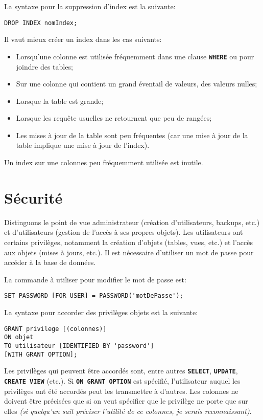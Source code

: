 \documentclass[a4paper, 12pt]{report}
\newcommand{\textSQL}[1]{\texttt{\textbf{#1}}}
\theoremstyle{definition} \newtheorem{ex}{Exemple}
\begin{document}
La syntaxe pour la suppression d'index est la suivante:
\begin{lstlisting}[frame=single]
DROP INDEX nomIndex;
\end{lstlisting}

Il vaut mieux créer un index dans les cas suivants:
\begin{itemize}
  \item Lorsqu'une colonne est utilisée fréquemment dans une clause \textSQL{WHERE} ou pour joindre des tables;
	\item Sur une colonne qui contient un grand éventail de valeurs, des valeurs nulles;
	\item Lorsque la table est grande;
	\item Lorsque les requête usuelles ne retournent que peu de rangées;
	\item Les mises à jour de la table sont peu fréquentes (car une mise à jour de la table implique une mise à jour de l'index).
\end{itemize}

Un index sur une colonnes peu fréquemment utilisée est inutile.
\chapter{Sécurité}
Distinguons le point de vue administrateur (création d'utilisateurs, backups, etc.) et d'utilisateurs (gestion de l'accès à ses propres objets). Les utilisateurs ont certains privilèges, notamment la création d'objets (tables, vues, etc.) et l'accès aux objets (mises à jours, etc.). Il est nécessaire d'utiliser un mot de passe pour accéder à la base de données.

La commande à utiliser pour modifier le mot de passe est:
\begin{lstlisting}[frame=single]
SET PASSWORD [FOR USER] = PASSWORD('motDePasse');
\end{lstlisting}

La syntaxe pour accorder des privilèges objets est la suivante:
\begin{lstlisting}[frame=single]
GRANT privilege [(colonnes)]
ON objet
TO utilisateur [IDENTIFIED BY 'password']
[WITH GRANT OPTION];
\end{lstlisting}
Les privilèges qui peuvent être accordés sont, entre autres \textSQL{SELECT}, \textSQL{UPDATE}, \textSQL{CREATE VIEW} (etc.). Si \textSQL{ON GRANT OPTION} est spécifié, l'utilisateur auquel les privilèges ont été accordés peut les transmettre à d'autres. Les colonnes ne doivent être précisées que si on veut spécifier que le privilège ne porte que sur elles \emph{(si quelqu'un sait préciser l'utilité de ce colonnes, je serais reconnaissant)}.
\end{document}
